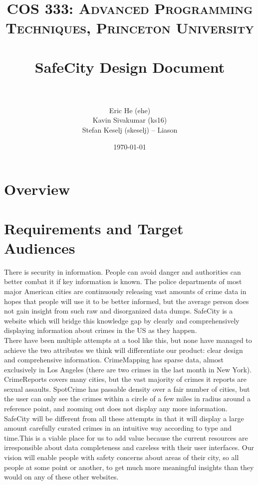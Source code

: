 \documentclass[paper=a4, fontsize=11pt]{scrartcl} %
\title{	
\normalfont \normalsize 
\textsc{COS 333: Advanced Programming Techniques, Princeton University} \\ [25pt] %
\horrule{0.5pt} \\[0.4cm] %
\huge SafeCity Design Document \\ %
\horrule{2pt} \\[0.5cm] %
}
\author{
Eric He (ehe) \\
Kavin Sivakumar (ks16) \\
Stefan Keselj (skeselj) -- Liason}
\date{\normalsize\today} %
\numberwithin{equation}{section} %
\numberwithin{figure}{section} %
\numberwithin{table}{section} %
\begin{document}
\maketitle %


\section{Overview}



\section{Requirements and Target Audiences}

There is security in information. People can avoid danger and authorities can better combat it if key information is known. The police departments of most major American cities are continuously releasing vast amounts of crime data in hopes that people will use it to be better informed, but the average person does not gain insight from such raw and disorganized data dumps. SafeCity is a website which will bridge this knowledge gap by clearly and comprehensively displaying information about crimes in the US as they happen. \\

There have been multiple attempts at a tool like this, but none have managed to achieve the two attributes we think will differentiate our product: clear design and comprehensive information. CrimeMapping has sparse data, almost exclusively in Los Angeles (there are two crimes in the last month in New York). CrimeReports covers many cities, but the vast majority of crimes it reports are sexual assaults. SpotCrime has passable density over a fair number of cities, but the user can only see the crimes within a circle of a few miles in radius around a reference point, and zooming out does not display any more information. \\

SafeCity will be different from all these attempts in that it will display a large amount carefully curated crimes in an intuitive way according to type and time.This is a viable place for us to add value because the current resources are irresponsible about data completeness and careless with their user interfaces. Our vision will enable people with safety concerns about areas of their city, so all people at some point or another, to get much more meaningful insights than they would on any of these other websites. 
\end{document}
